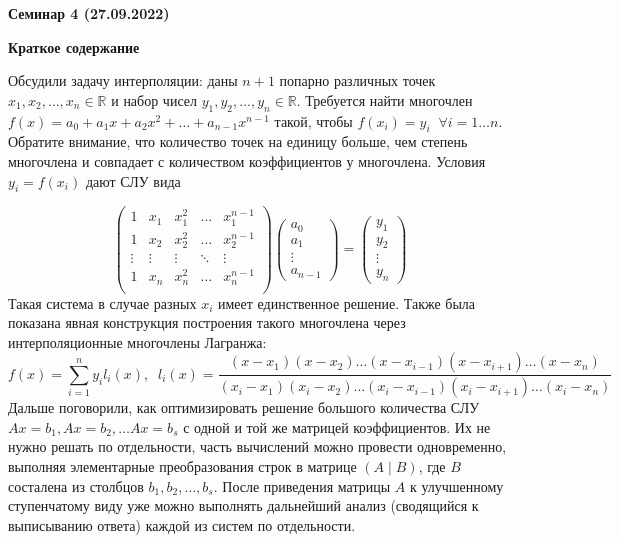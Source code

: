 \documentclass[10pt, a4paper]{extarticle}
\def \R{\mathbb{R}}
\theoremstyle{definition}
\begin{document}
\begin{center}
\small
\noindent{}
\end{center}

\large

\begin{center}
\textbf{Семинар 4 (27.09.2022)}
\end{center}

\textbf{Краткое содержание}

Обсудили задачу интерполяции: даны $n+1$ попарно различных точек $x_1, x_2, \dots, x_n \in \R$
и набор чисел $y_1, y_2, \dots, y_n \in \R$. Требуется найти многочлен $f(x) = a_0 + a_1x + a_2x^2 + \dots + a_{n-1}x^{n-1}$ такой,
чтобы $f(x_i) = y_i \;\; \forall i = 1\dots n$. Обратите внимание, что количество точек на единицу больше, чем степень многочлена
и совпадает с количеством коэффициентов у многочлена. Условия $y_i = f(x_i)$ дают СЛУ вида

\[
   \begin{pmatrix}
    1 & x_1 & x_1^2 & \dots & x_1^{n-1}\\
    1 & x_2 & x_2^2 & \dots & x_2^{n-1} \\
    \vdots & \vdots & \vdots & \ddots & \vdots \\
    1 & x_n & x_n^2 & \dots & x_n^{n-1} \\
   \end{pmatrix} 
   \begin{pmatrix}
    a_0 \\ a_1 \\ \vdots \\ a_{n-1}
   \end{pmatrix} =
   \begin{pmatrix}
    y_1 \\ y_2 \\ \vdots \\ y_{n}
   \end{pmatrix}
\]
Такая система в случае разных $x_i$ имеет единственное решение. Также была показана явная конструкция построения такого многочлена
через интерполяционные многочлены Лагранжа:
\[
f(x) = \sum_{i=1}^n y_i l_i(x), \;\; 
l_i(x) = \frac{(x-x_1)(x-x_2)\dots (x-x_{i-1}) (x - x_{i+1}) \dots (x- x_n)}{(x_i-x_1)(x_i-x_2)\dots (x_i-x_{i-1}) (x_i - x_{i+1}) \dots (x_i- x_n)}
\]
Дальше поговорили, как оптимизировать решение большого количества СЛУ $Ax=b_1, Ax = b_2, \dots Ax = b_s$ с одной и той же матрицей коэффициентов.
Их не нужно решать по отдельности, часть вычислений можно провести одновременно, выполняя элементарные преобразования строк в матрице $(A \mid B)$, 
где $B$ состалена из столбцов $b_1, b_2, \dots, b_s$. После приведения матрицы $A$ к улучшенному ступенчатому виду уже можно выполнять дальнейший анализ
(сводящийся к выписыванию ответа) каждой из систем по отдельности.
\end{document}
